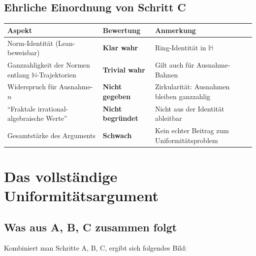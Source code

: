 \documentclass[12pt,a4paper]{article}
\newcommand{\N}{\mathbb{N}}
\newcommand{\H}{\mathbb{H}}
\begin{document}
\subsection{Ehrliche Einordnung von Schritt C}

\begin{center}
\renewcommand{\arraystretch}{1.4}
\begin{tabular}{>{\raggedright}p{4.0cm}
                >{\centering}p{2.8cm}
                >{\raggedright\arraybackslash}p{5.5cm}}
\toprule
\textbf{Aspekt} & \textbf{Bewertung} & \textbf{Anmerkung} \\
\midrule
Norm-Identität (Lean-beweisbar)
  & \textcolor{bewiesengrün}{\bfseries Klar wahr}
  & Ring-Identität in $\H$ \\[2pt]
Ganzzahligkeit der Normen entlang $\N$-Trajektorien
  & \textcolor{bewiesengrün}{\bfseries Trivial wahr}
  & Gilt auch für Ausnahme-Bahnen \\[2pt]
Widerspruch für Ausnahme-$n$
  & \textcolor{lückenrot}{\bfseries Nicht gegeben}
  & Zirkularität: Ausnahmen bleiben ganzzahlig \\[2pt]
``Fraktale irrational-algebraische Werte''
  & \textcolor{lückenrot}{\bfseries Nicht begründet}
  & Nicht aus der Identität ableitbar \\[2pt]
Gesamtstärke des Arguments
  & \textcolor{lückenrot}{\bfseries Schwach}
  & Kein echter Beitrag zum Uniformitätsproblem \\
\bottomrule
\end{tabular}
\end{center}

\section{Das vollständige Uniformitätsargument}
\label{sec:uniform}

\subsection{Was aus A, B, C zusammen folgt}

Kombiniert man Schritte A, B, C, ergibt sich folgendes Bild:
\end{document}
